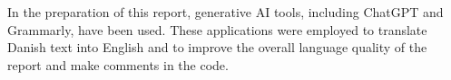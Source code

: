 In the preparation of this report, generative AI tools, including ChatGPT and Grammarly, have been used. These applications were employed to translate Danish text into English and to improve the overall language quality of the report and make comments in the code.
